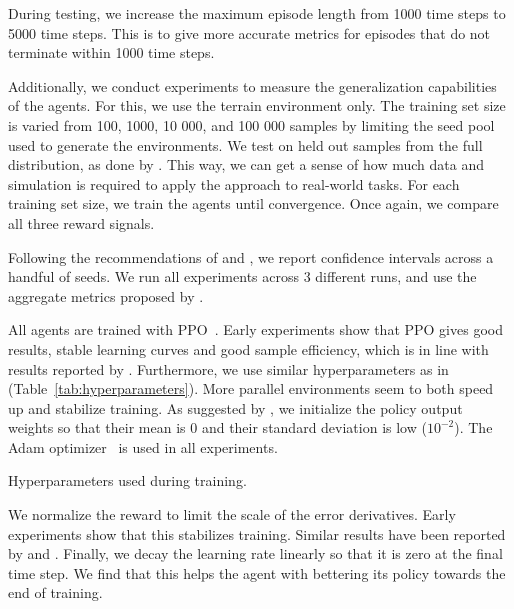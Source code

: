 During testing, we increase the maximum episode length from 1000 time steps to 5000 time steps.
This is to give more accurate metrics for episodes that do not terminate within 1000 time steps. 

Additionally, we conduct experiments to measure the generalization capabilities of the agents.
For this, we use the terrain environment only.
The training set size is varied from 100, 1000, 10 000, and 100 000 samples by limiting the seed pool used to generate the environments.
We test on held out samples from the full distribution, as done by \cite{cobbe_procgen_2020}.
This way, we can get a sense of how much data and simulation is required to apply the approach to real-world tasks.
For each training set size, we train the agents until convergence.
Once again, we compare all three reward signals.

Following the recommendations of \cite{henderson_matters_2018} and \cite{agarwal_rlliable_2022}, we report confidence intervals across a handful of seeds.
We run all experiments across 3 different runs, and use the aggregate metrics proposed by \cite{agarwal_rlliable_2022}.

All agents are trained with PPO~\cite{schulman_ppo_2017}.
Early experiments show that PPO gives good results, stable learning curves and good sample efficiency, which is in line with results reported by \cite{andrychowicz_empirical_2020}.
Furthermore, we use similar hyperparameters as in \cite{cobbe_procgen_2020} (Table~\ref{tab:hyperparameters}).
More parallel environments seem to both speed up and stabilize training.
As suggested by \cite{andrychowicz_empirical_2020}, we initialize the policy output weights so that their mean is 0 and their standard deviation is low (\(10^{-2}\)).
The Adam optimizer~\cite{kingma_ba_2017} is used in all experiments.

\begin{table}
    \centering
    \caption{Hyperparameters used during training.}
    
    \label{tab:hyperparameters}
\end{table}

We normalize the reward to limit the scale of the error derivatives.
Early experiments show that this stabilizes training.
Similar results have been reported by \cite{andrychowicz_empirical_2020} and \cite{mnih_atari_2013}.
Finally, we decay the learning rate linearly so that it is zero at the final time step.
We find that this helps the agent with bettering its policy towards the end of training.

